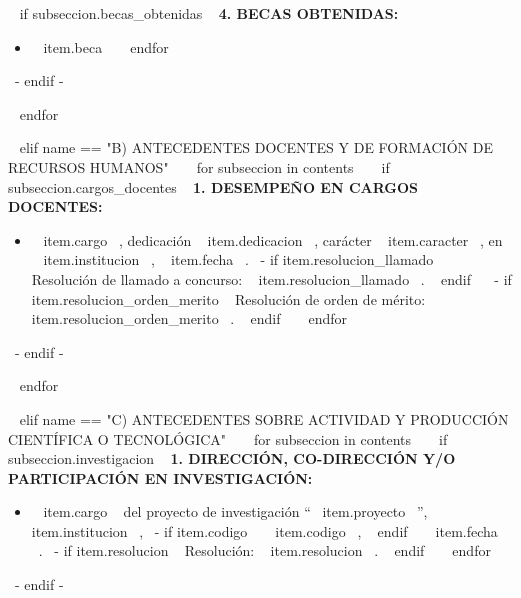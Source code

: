     ~{ if subseccion.becas_obtenidas }~
      \textbf{4. BECAS OBTENIDAS:}
      \begin{itemize}
      ~{ for item in subseccion.becas_obtenidas }~
        \item ~{{ item.beca }}~
        \espacioEntreItems{}
      ~{ endfor }~
      \end{itemize}
      \espacioEntreSubSecciones{}
    ~{- endif -}~

  ~{ endfor }~
  \espacioEntreSecciones{}

~{ elif name == "B) ANTECEDENTES DOCENTES Y DE FORMACIÓN DE RECURSOS HUMANOS" }~
  ~{ for subseccion in contents }~
    ~{ if subseccion.cargos_docentes }~
      \textbf{1. DESEMPEÑO EN CARGOS DOCENTES:}
      \begin{itemize}
      ~{ for item in subseccion.cargos_docentes }~
        \item ~{{ item.cargo }}~, dedicación ~{{ item.dedicacion }}~, carácter ~{{ item.caracter }}~, en ~{{ item.institucion }}~, ~{{ item.fecha }}~.
              ~{- if item.resolucion_llamado }~ Resolución de llamado a concurso: ~{{ item.resolucion_llamado }}~. ~{ endif }~
              ~{- if item.resolucion_orden_merito }~ Resolución de orden de mérito: ~{{ item.resolucion_orden_merito }}~. ~{ endif }~
        \espacioEntreItems{}
      ~{ endfor }~
      \end{itemize}
      \espacioEntreSubSecciones{}
    ~{- endif -}~

  ~{ endfor }~
  \espacioEntreSecciones{}


~{ elif name == "C) ANTECEDENTES SOBRE ACTIVIDAD Y PRODUCCIÓN CIENTÍFICA O TECNOLÓGICA" }~
  ~{ for subseccion in contents }~
    ~{ if subseccion.investigacion }~
      \textbf{1. DIRECCIÓN, CO-DIRECCIÓN Y/O PARTICIPACIÓN EN INVESTIGACIÓN:}
      \begin{itemize}
      ~{ for item in subseccion.investigacion }~
        \item ~{{ item.cargo }}~ del proyecto de investigación ``~{{ item.proyecto }}~'', ~{{ item.institucion }}~,
              ~{- if item.codigo }~ ~{{ item.codigo }}~, ~{ endif }~
              ~{{ item.fecha }}~.
              ~{- if item.resolucion }~ Resolución: ~{{ item.resolucion }}~. ~{ endif }~
        \espacioEntreItems{}
      ~{ endfor }~
      \end{itemize}
      \espacioEntreSubSecciones{}
    ~{- endif -}~

